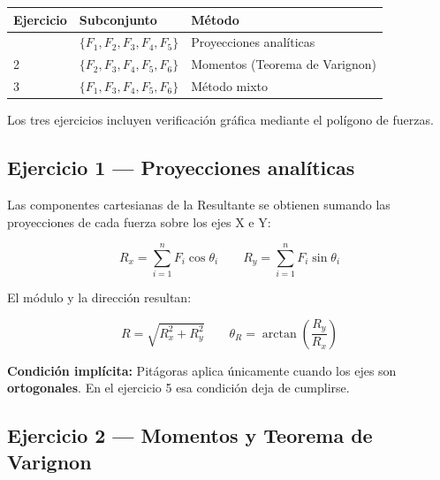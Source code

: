 \documentclass[
  spanish,
  11pt,
  a4paper,
]{article}
\begin{document}
\begin{longtable}[]{@{}lll@{}}
\toprule\noalign{}
Ejercicio & Subconjunto & Método \\
\midrule\noalign{}
\endhead
\bottomrule\noalign{}
\endlastfoot
1 & \(\{F_1, F_2, F_3, F_4, F_5\}\) & Proyecciones analíticas \\
2 & \(\{F_2, F_3, F_4, F_5, F_6\}\) & Momentos (Teorema de Varignon) \\
3 & \(\{F_1, F_3, F_4, F_5, F_6\}\) & Método mixto \\
\end{longtable}

Los tres ejercicios incluyen verificación gráfica mediante el polígono
de fuerzas.

\subsection{Ejercicio 1 --- Proyecciones
analíticas}\label{ejercicio-1-proyecciones-analuxedticas}

Las componentes cartesianas de la Resultante se obtienen sumando las
proyecciones de cada fuerza sobre los ejes X e Y:

\[R_x = \sum_{i=1}^{n} F_i \cos\theta_i \qquad R_y = \sum_{i=1}^{n} F_i \sin\theta_i\]

El módulo y la dirección resultan:

\[R = \sqrt{R_x^2 + R_y^2} \qquad \theta_R = \arctan\!\left(\frac{R_y}{R_x}\right)\]

\begin{tcolorbox}[enhanced jigsaw, bottomrule=.15mm, bottomtitle=1mm, titlerule=0mm, leftrule=.75mm, rightrule=.15mm, title=\textcolor{quarto-callout-warning-color}{\faExclamationTriangle}\hspace{0.5em}{Advertencia}, coltitle=black, colframe=quarto-callout-warning-color-frame, left=2mm, opacitybacktitle=0.6, opacityback=0, toptitle=1mm, toprule=.15mm, colbacktitle=quarto-callout-warning-color!10!white, colback=white, breakable, arc=.35mm]

\textbf{Condición implícita:} Pitágoras aplica únicamente cuando los
ejes son \textbf{ortogonales}. En el ejercicio 5 esa condición deja de
cumplirse.

\end{tcolorbox}

\subsection{Ejercicio 2 --- Momentos y Teorema de
Varignon}\label{ejercicio-2-momentos-y-teorema-de-varignon}
\end{document}
